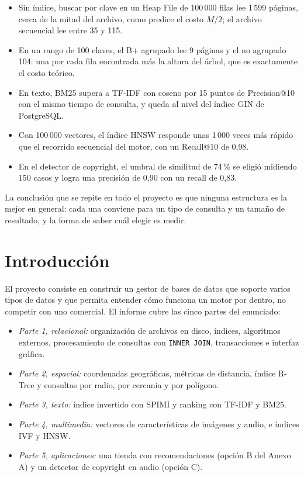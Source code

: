 \documentclass[11pt,a4paper]{article}
\begin{document}
\begin{itemize}
  \item Sin índice, buscar por clave en un Heap File de 100\,000 filas lee 1\,599 páginas, cerca de la mitad del archivo, como predice el costo $M/2$; el archivo secuencial lee entre 35 y 115.
  \item En un rango de 100 claves, el B+ agrupado lee 9 páginas y el no agrupado 104: una por cada fila encontrada más la altura del árbol, que es exactamente el costo teórico.
  \item En texto, BM25 supera a TF-IDF con coseno por 15 puntos de Precision@10 con el mismo tiempo de consulta, y queda al nivel del índice GIN de PostgreSQL.
  \item Con 100\,000 vectores, el índice HNSW responde unas 1\,000 veces más rápido que el recorrido secuencial del motor, con un Recall@10 de 0,98.
  \item En el detector de copyright, el umbral de similitud de 74\,\% se eligió midiendo 150 casos y logra una precisión de 0,90 con un recall de 0,83.
\end{itemize}

La conclusión que se repite en todo el proyecto es que ninguna estructura es la mejor en general: cada una conviene para un tipo de consulta y un tamaño de resultado, y la forma de saber cuál elegir es medir.

\tableofcontents
\newpage

\section{Introducción}

El proyecto consiste en construir un gestor de bases de datos que soporte varios tipos de datos y que permita entender cómo funciona un motor por dentro, no competir con uno comercial. El informe cubre las cinco partes del enunciado:

\begin{itemize}
  \item \emph{Parte 1, relacional:} organización de archivos en disco, índices, algoritmos externos, procesamiento de consultas con \texttt{INNER JOIN}, transacciones e interfaz gráfica.
  \item \emph{Parte 2, espacial:} coordenadas geográficas, métricas de distancia, índice R-Tree y consultas por radio, por cercanía y por polígono.
  \item \emph{Parte 3, texto:} índice invertido con SPIMI y ranking con TF-IDF y BM25.
  \item \emph{Parte 4, multimedia:} vectores de características de imágenes y audio, e índices IVF y HNSW.
  \item \emph{Parte 5, aplicaciones:} una tienda con recomendaciones (opción B del Anexo A) y un detector de copyright en audio (opción C).
\end{itemize}
\end{document}
